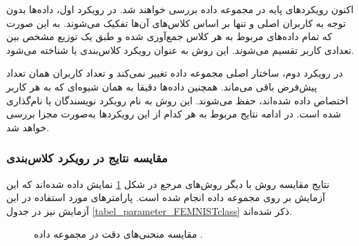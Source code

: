 اکنون رویکردهای پایه در مجموعه داده
بررسی خواهند شد. در رویکرد اول، داده‌ها بدون توجه به کاربران اصلی و تنها بر اساس کلاس‌های آن‌ها تفکیک می‌شوند. به این صورت که تمام داده‌های مربوط به هر کلاس جمع‌آوری شده و طبق یک توزیع مشخص بین تعدادی کاربر تقسیم می‌شوند. این روش به عنوان رویکرد کلاس‌بندی یا
شناخته می‌شود.

در رویکرد دوم، ساختار اصلی مجموعه داده تغییر نمی‌کند و تعداد کاربران همان تعداد پیش‌فرض باقی می‌ماند. همچنین داده‌ها دقیقا به همان شیوه‌ای که به هر کاربر اختصاص داده شده‌اند، حفظ می‌شوند. این روش به نام رویکرد نویسندگان یا
نام‌گذاری شده است. در ادامه نتایج مربوط به هر کدام از این رویکرد‌ها به‌صورت مجزا بررسی خواهد شد.






\subsubsection{
	مقایسه نتایج در رویکرد کلاس‌بندی
}

نتایج مقایسه روش
با دیگر روش‌های مرجع در شکل
\ref{result_FEMNISTclass}
نمایش داده شده‌اند که این آزمایش بر روی مجموعه داده
انجام شده است. پارامترهای مورد استفاده در این آزمایش نیز در جدول
\ref{tabel_parameter_FEMNISTclass}
ذکر شده‌اند.


\begin{figure}[t]
	\centering
	\hspace{0.8mm}
	\caption{
		مقایسه منحنی‌های دقت در مجموعه داده
		.
	}
	\label{result_FEMNISTclass}
\end{figure}


